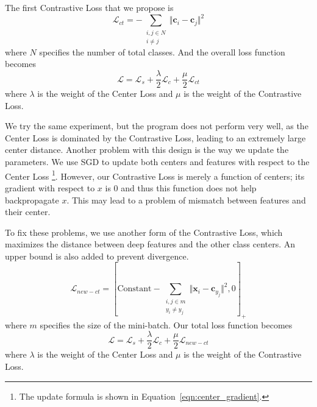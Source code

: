 \documentclass[a4paper]{article}
\begin{document}
The first Contrastive Loss that we propose is 
\begin{equation}
	\mathcal{L}_{ct} = - \sum_{\substack{i,j \in N \\ i \neq j}} \Vert \mathbf{c}_{i} - \mathbf{c}_{j} \Vert^{2}
\end{equation}
where $N$ specifies the number of total classes. And the overall loss function becomes
\begin{equation}
		\mathcal{L}  = \mathcal{L}_{s} + \frac{\lambda}{2} \mathcal{L}_{c} + \frac{\mu}{2} \mathcal{L}_{ct}
\end{equation}
where $\lambda$ is the weight of the Center Loss and $\mu$ is the weight of the Contrastive Loss.

We try the same experiment, but the program does not perform very well, as the Center Loss is dominated by the Contrastive Loss, leading to an extremely large center distance. Another problem with this design is the way we update the parameters. We use SGD to update both centers and features with respect to the Center Loss \footnote{The update formula is shown in Equation~\ref{eqn:center_gradient}.}. However, our Contrastive Loss is merely a function of centers; its gradient with respect to $x$ is $0$ and thus this function does not help backpropagate $x$. This may lead to a problem of mismatch between features and their center. 

To fix these problems, we use another form of the Contrastive Loss, which maximizes the distance between deep features and the other class centers. An upper bound is also added to prevent divergence.
\begin{equation}
	\mathcal{L}_{new-ct} = [\text{Constant} - \sum_{\substack{i,j \in m \\ y_i \neq y_j}} \Vert \mathbf{x}_{i} - \mathbf{c}_{ y_{j}} \Vert^{2},0]_{+}
\end{equation}
where $m$ specifies the size of the mini-batch. Our total loss function becomes
\begin{equation}
	\mathcal{L}  = \mathcal{L}_{s} + \frac{\lambda}{2} \mathcal{L}_{c} + \frac{\mu}{2} \mathcal{L}_{new-ct}
\end{equation}
where $\lambda$ is the weight of the Center Loss and $\mu$ is the weight of the Contrastive Loss.
\end{document}

